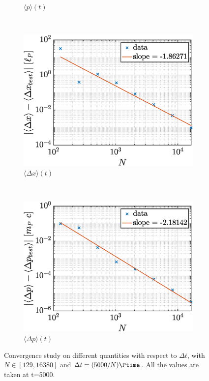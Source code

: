 \documentclass[a4paper,12pt,twoside]{article}
\begin{document}
\begin{figure}[h]
\begin{subfigure}{0.45\textwidth}
        \caption{$\langle p \rangle (t)$}
        \label{fig:i_conv_p}
      \end{subfigure}
      ~
      \begin{subfigure}{0.45\textwidth}
        \includegraphics[width=\textwidth]{graphs/i_conv_dx.eps}
        \caption{$\langle \Delta x \rangle (t)$}
        \label{fig:i_conv_dx}
      \end{subfigure}
      ~
      \begin{subfigure}{0.45\textwidth}
        \includegraphics[width=\textwidth]{graphs/i_conv_dp.eps}
        \caption{$\langle \Delta p \rangle (t)$}
        \label{fig:i_conv_dp}
      \end{subfigure}
      \caption{Convergence study on different quantities with respect to $\Delta t$, with $N\in[\num{129}, \num{16380}]$ and $\Delta t = (\num{5000}/N) \si{\Ptime}$. All the values are taken at t=\SI{5000}{\Ptime}.}
      \label{fig:i_conv}
    \end{figure}
\end{document}
